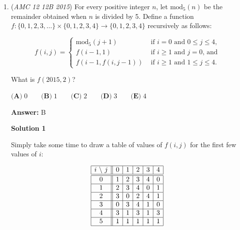 \begin{enumerate}
 Setting the first paragraph's $\overline{YZ}^2$ equal to the second:
 \[288 + x^2 + 4x\sqrt{144-x^2}=2x^2 + 24x\sqrt{2} + 288\]




\textbf{Solution 7 (Right Triangle Altitude Theorem)}

This solution does not use the fact that the four points are cyclic.Let $CA=x$, and $CB=y$. Looking at the figure, its trivial that the points $Z$, $C$, $A$ are concurrent. Construct line $ZB$. By the right triangle altitude theorem, we have: 
 \[y^2=xy\].By Pythagoras' Theorem, we also have 
 \[x^2 + y^2 = 12^2\]Solving the two equations above, we have $x=y=6\sqrt2$. Hence, the perimeter is $12 + x + y = \boxed{\textbf{(C) }12+12\sqrt{2}}$.

 


	\item (\textit{AMC 12 12B 2015}) For every positive integer $n$, let $\text{mod}_5 (n)$ be the remainder obtained when $n$ is divided by 5. Define a function $f: \{0,1,2,3,\dots\} \times \{0,1,2,3,4\} \to \{0,1,2,3,4\}$ recursively as follows:


 
 \[f(i,j) = \begin{cases}\text{mod}_5 (j+1) & \text{ if } i = 0 \text{ and } 0 \le j \le 4 \text{,}\\ f(i-1,1) & \text{ if } i \ge 1 \text{ and } j = 0 \text{, and} \\ f(i-1, f(i,j-1)) & \text{ if } i \ge 1 \text{ and } 1 \le j \le 4. \end{cases}\]


 What is $f(2015,2)$?


 $\textbf{(A)}\; 0 \qquad\textbf{(B)}\; 1 \qquad\textbf{(C)}\; 2 \qquad\textbf{(D)}\; 3 \qquad\textbf{(E)}\; 4$

 \textbf{Answer: }B



\textbf{Solution 1}

Simply take some time to draw a table of values of $f(i,j)$ for the first few values of $i$:

 
 \[\begin{array}{|c || c | c | c | c | c |} \hline i \text{\ \textbackslash\ } j & 0 & 1 & 2 & 3 & 4\\ \hline\hline 0 & 1 & 2 & 3 & 4 & 0\\ \hline 1 & 2 & 3 & 4 & 0 & 1\\ \hline 2 & 3 & 0 & 2 & 4 & 1\\ \hline 3 & 0 & 3 & 4 & 1 & 0\\ \hline 4 & 3 & 1 & 3 & 1 & 3\\ \hline 5 & 1 & 1 & 1 & 1 & 1\\ \hline \end{array}\]


\end{enumerate}
